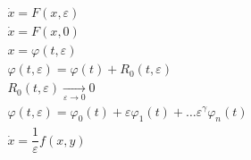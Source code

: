\begin{lecture}
\begin{lecSection}
		\begin{gather*}
			\dot{x} = F(x, \varepsilon) \\
			\dot{x} = F(x, 0) \\
			x = \varphi (t, \varepsilon) \\
			\varphi (t, \varepsilon) = \varphi (t) + R_0 (t, \varepsilon) \\
			R_0 (t, \varepsilon) \xrightarrow[\varepsilon \rightarrow 0]{} 0 \\
			\varphi (t, \varepsilon) = \varphi_0 (t) + \varepsilon \varphi_1 (t) + \dots \varepsilon^\gamma \varphi_n (t) \\
			\dot{x} = \dfrac{1}{\varepsilon} f (x, y)
		\end{gather*}
	\end{lecSection}
\end{lecture}